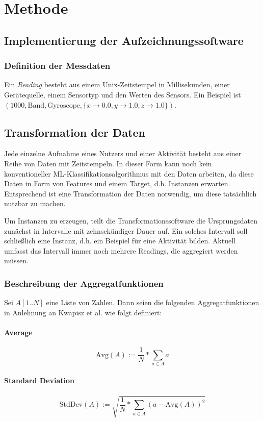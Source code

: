 \chapter{Methode}
\label{chap:method}

\section{Implementierung der Aufzeichnungssoftware}
\subsection{Definition der Messdaten}
 Ein \textit{Reading} besteht aus einem Unix-Zeitstempel in Millisekunden, einer Gerätequelle, einem Sensortyp und den Werten des Sensors. Ein Beispiel ist $(1000, \text{Band}, \text{Gyroscope}, \{x \to 0.0, y \to 1.0, z \to 1.0\})$.

\section{Transformation der Daten}
Jede einzelne Aufnahme eines Nutzers und einer Aktivität besteht aus einer Reihe von Daten mit Zeitstempeln. In dieser Form kann noch kein konventioneller ML-Klassifikationsalgorithmus mit den Daten arbeiten, da diese Daten in Form von Features und einem Target, d.h. Instanzen erwarten. Entsprechend ist eine Transformation der Daten notwendig, um diese tatsächlich nutzbar zu machen.

Um Instanzen zu erzeugen, teilt die Transformationssoftware die Ursprungsdaten zunächst in Intervalle mit zehnsekündiger Dauer auf. Ein solches Intervall soll schließlich eine Instanz, d.h. ein Beispiel für eine Aktivität bilden. Aktuell umfasst das Intervall immer noch mehrere Readings, die aggregiert werden müssen.


\subsection{Beschreibung der Aggregatfunktionen}
Sei $A[1..N]$ eine Liste von Zahlen. Dann seien die folgenden Aggregatfunktionen in Anlehnung an Kwapisz et al.\cite{Kwapisz2011} wie folgt definiert:
\subsubsection{Average}
\[
\text{Avg}(A) := \frac{1}{N} * \sum_{a \in A} a
\]
\subsubsection{Standard Deviation}
\[
\text{StdDev}(A) := \sqrt{\frac{1}{N} * \sum_{a \in A} (a - \text{Avg}(A))^2}
\]
